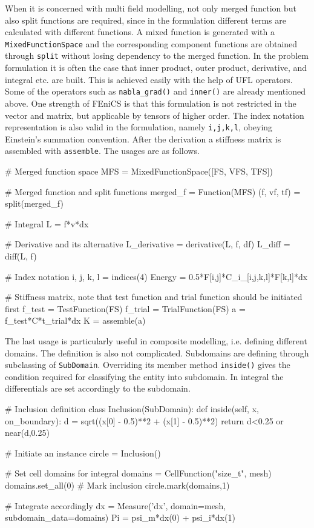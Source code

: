 When it is concerned with multi field modelling, not only merged function but also split functions are required, since in the formulation different terms are calculated with different functions. A mixed function is generated with a \texttt{MixedFunctionSpace} and the corresponding component functions are obtained through \texttt{split} without losing dependency to the merged function. In the problem formulation it is often the case that inner product, outer product, derivative, and integral etc. are built. This is achieved easily with the help of UFL operators. Some of the operators such as \texttt{nabla\_grad()} and \texttt{inner()} are already mentioned above. One strength of FEniCS is that this formulation is not restricted in the vector and matrix, but applicable by tensors of higher order. The index notation representation is also valid in the formulation, namely \texttt{i,j,k,l}, obeying Einstein's summation convention. After the derivation a stiffness matrix is assembled with \texttt{assemble}. The usages are as follows.

\begin{python}
# Merged function space
MFS = MixedFunctionSpace([FS, VFS, TFS])

# Merged function and split functions
merged_f = Function(MFS)
(f, vf, tf) = split(merged_f)

# Integral
L = f*v*dx

# Derivative and its alternative
L_derivative = derivative(L, f, df)
L_diff = diff(L, f)

# Index notation
i, j, k, l = indices(4)
Energy = 0.5*F[i,j]*C_i_[i,j,k,l]*F[k,l]*dx

# Stiffness matrix, note that test function and trial function should be initiated first
f_test = TestFunction(FS)
f_trial = TrialFunction(FS)
a = f_test*C*t_trial*dx
K = assemble(a)
\end{python}

The last usage is particularly useful in composite modelling, i.e. defining different domains. The definition is also not complicated. Subdomains are defining through subclassing of \texttt{SubDomain}. Overriding its member method \texttt{inside()} gives the condition required for classifying the entity into subdomain. In integral the differentials are set accordingly to the subdomain.


\begin{python}
# Inclusion definition
class Inclusion(SubDomain):
    def inside(self, x, on_boundary):
        d = sqrt((x[0] - 0.5)**2 + (x[1] - 0.5)**2)
        return d<0.25 or near(d,0.25)

# Initiate an instance
circle = Inclusion()

# Set cell domains for integral
domains = CellFunction("size_t", mesh)
domains.set_all(0)
# Mark inclusion
circle.mark(domains,1)

# Integrate accordingly
dx = Measure('dx', domain=mesh, subdomain_data=domains)
Pi = psi_m*dx(0) + psi_i*dx(1)
\end{python}

%

